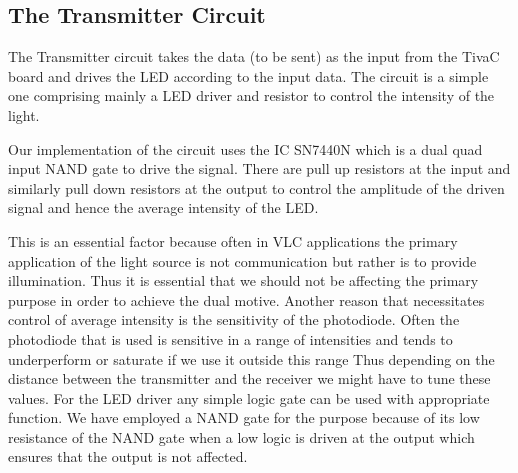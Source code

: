 \documentclass{article}
\begin{document}
\subsection{The Transmitter Circuit}
The Transmitter circuit takes the data (to be sent) as the input from the TivaC board and drives the LED according to the input data. The circuit is a simple one comprising mainly a LED driver  and resistor to control the intensity of the light.

Our implementation of the circuit uses the IC SN7440N which is a dual quad input NAND gate to drive the signal. There are pull up resistors at the input and similarly pull down resistors at the output to control the amplitude of the driven signal and hence the average intensity of the LED.

This is an essential factor because often in VLC applications the primary application of the light source is not communication but rather is to provide illumination. Thus it is essential that we should not be affecting the primary purpose in order to achieve the dual motive. Another reason that necessitates control of average intensity is the sensitivity of the photodiode. Often the photodiode that is used is sensitive in a range of intensities and tends to underperform or saturate if we use it outside this range Thus depending on the distance between the transmitter and the receiver we might have to tune these values. For the LED driver any simple logic gate can be used with appropriate function. We have employed a NAND gate for the purpose because of its low resistance of the NAND gate when a low logic is driven at the output which ensures that the output is not affected.
\end{document}
